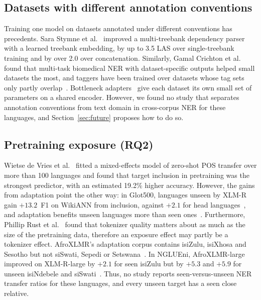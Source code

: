 \subsection{Datasets with different annotation conventions}\label{sec:rw-guidelines}
Training one model on datasets annotated under different conventions has precedents. Sara Stymne et al.~\cite{stymne2018} improved a multi-treebank dependency parser with a learned treebank embedding, by up to 3.5 LAS over single-treebank training and by over 2.0 over concatenation. Similarly, Gamal Crichton et al.~\cite{crichton2017} found that multi-task biomedical NER with dataset-specific outputs helped small datasets the most, and taggers have been trained over datasets whose tag sets only partly overlap~\cite{greenberg2018,huang2019}. Bottleneck adapters~\cite{houlsby2019,pfeiffer2020} give each dataset its own small set of parameters on a shared encoder. However, we found no study that separates annotation conventions from text domain in cross-corpus NER for these languages, and Section~\ref{sec:future} proposes how to do so.

\subsection{Pretraining exposure (RQ2)}\label{sec:rw-rq2}
Wietse de Vries et al.~\cite{devries2022} fitted a mixed-effects model of zero-shot POS transfer over more than 100 languages and found that target inclusion in pretraining was the strongest predictor, with an estimated 19.2\% higher accuracy. However, the gains from adaptation point the other way: in Glot500, languages unseen by XLM-R gain $+13.2$~F1 on WikiANN from inclusion, against $+2.1$ for head languages~\cite{imani2023}, and adaptation benefits unseen languages more than seen ones~\cite{ansell2022,faisal2022}. Furthermore, Phillip Rust et al.~\cite{rust2021} found that tokenizer quality matters about as much as the size of the pretraining data, therefore an exposure effect may partly be a tokenizer effect. AfroXLMR's adaptation corpus contains isiZulu, isiXhosa and Sesotho but not siSwati, Sepedi or Setswana~\cite{alabi2022}. In NGLUEni, AfroXLMR-large improved on XLM-R-large by $+2.1$ for seen isiZulu but by $+5.3$ and $+5.9$ for unseen isiNdebele and siSwati~\cite{meyer2024}. Thus, no study reports seen-versus-unseen NER transfer ratios for these languages, and every unseen target has a seen close relative.

